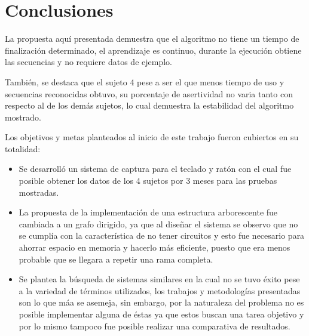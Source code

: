 \section{Conclusiones}
La propuesta aqu\'{i} presentada demuestra que el algoritmo no tiene
 un tiempo de finalizaci\'on determinado, el aprendizaje es continuo, durante 
 la ejecuci\'on obtiene las secuencias y no requiere datos de ejemplo.
 
Tambi\'en, se destaca que el sujeto 4 pese a ser el que menos tiempo de uso y 
 secuencias reconocidas obtuvo, su porcentaje de asertividad no varia tanto con 
 respecto al de los dem\'as sujetos, lo cual demuestra la estabilidad del 
 algoritmo mostrado. 
 
Los objetivos y metas planteados al inicio de este trabajo fueron cubiertos en
 su totalidad:

\begin{itemize}
\item {
Se desarroll\'o un sistema de captura para el teclado y rat\'on con el cual fue 
 posible obtener los datos de los 4 sujetos por 3 meses para las pruebas 
 mostradas.
}
	
\item {
La propuesta de la implementaci\'on de una estructura arborescente fue cambiada
 a un grafo dirigido, ya que al dise\~nar el sistema se observo que no se 
 cumpl\'ia con la caracter\'istica de no tener circuitos y esto fue necesario
 para ahorrar espacio en memoria y hacerlo m\'as eficiente, puesto que era
 menos probable que se llegara a repetir una rama completa. 
}

\item {
Se plantea la b\'usqueda de sistemas similares en la cual no se tuvo \'exito
 pese a la variedad de t\'erminos utilizados, los trabajos y metodolog\'ias
 presentadas son lo que m\'aa se asemeja, sin embargo, por la naturaleza del 
 problema no es posible implementar alguna de \'estas ya que estos buscan una
 tarea objetivo y por lo mismo tampoco fue posible realizar una comparativa de
 resultados.
}
\end{itemize}

